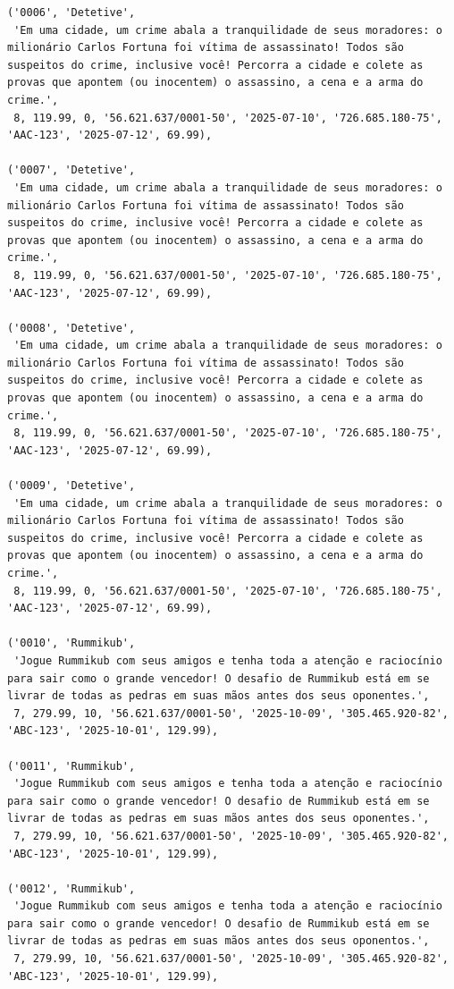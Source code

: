 \documentclass[11pt]{article}
\begin{document}
\begin{Verbatim}[breaklines=true, breakanywhere=true]
('0006', 'Detetive',
 'Em uma cidade, um crime abala a tranquilidade de seus moradores: o milionário Carlos Fortuna foi vítima de assassinato! Todos são suspeitos do crime, inclusive você! Percorra a cidade e colete as provas que apontem (ou inocentem) o assassino, a cena e a arma do crime.',
 8, 119.99, 0, '56.621.637/0001-50', '2025-07-10', '726.685.180-75', 'AAC-123', '2025-07-12', 69.99),

('0007', 'Detetive',
 'Em uma cidade, um crime abala a tranquilidade de seus moradores: o milionário Carlos Fortuna foi vítima de assassinato! Todos são suspeitos do crime, inclusive você! Percorra a cidade e colete as provas que apontem (ou inocentem) o assassino, a cena e a arma do crime.',
 8, 119.99, 0, '56.621.637/0001-50', '2025-07-10', '726.685.180-75', 'AAC-123', '2025-07-12', 69.99),

('0008', 'Detetive',
 'Em uma cidade, um crime abala a tranquilidade de seus moradores: o milionário Carlos Fortuna foi vítima de assassinato! Todos são suspeitos do crime, inclusive você! Percorra a cidade e colete as provas que apontem (ou inocentem) o assassino, a cena e a arma do crime.',
 8, 119.99, 0, '56.621.637/0001-50', '2025-07-10', '726.685.180-75', 'AAC-123', '2025-07-12', 69.99),

('0009', 'Detetive',
 'Em uma cidade, um crime abala a tranquilidade de seus moradores: o milionário Carlos Fortuna foi vítima de assassinato! Todos são suspeitos do crime, inclusive você! Percorra a cidade e colete as provas que apontem (ou inocentem) o assassino, a cena e a arma do crime.',
 8, 119.99, 0, '56.621.637/0001-50', '2025-07-10', '726.685.180-75', 'AAC-123', '2025-07-12', 69.99),

('0010', 'Rummikub',
 'Jogue Rummikub com seus amigos e tenha toda a atenção e raciocínio para sair como o grande vencedor! O desafio de Rummikub está em se livrar de todas as pedras em suas mãos antes dos seus oponentes.',
 7, 279.99, 10, '56.621.637/0001-50', '2025-10-09', '305.465.920-82', 'ABC-123', '2025-10-01', 129.99),

('0011', 'Rummikub',
 'Jogue Rummikub com seus amigos e tenha toda a atenção e raciocínio para sair como o grande vencedor! O desafio de Rummikub está em se livrar de todas as pedras em suas mãos antes dos seus oponentes.',
 7, 279.99, 10, '56.621.637/0001-50', '2025-10-09', '305.465.920-82', 'ABC-123', '2025-10-01', 129.99),

('0012', 'Rummikub',
 'Jogue Rummikub com seus amigos e tenha toda a atenção e raciocínio para sair como o grande vencedor! O desafio de Rummikub está em se livrar de todas as pedras em suas mãos antes dos seus oponentos.',
 7, 279.99, 10, '56.621.637/0001-50', '2025-10-09', '305.465.920-82', 'ABC-123', '2025-10-01', 129.99),


\end{Verbatim}
\end{document}
